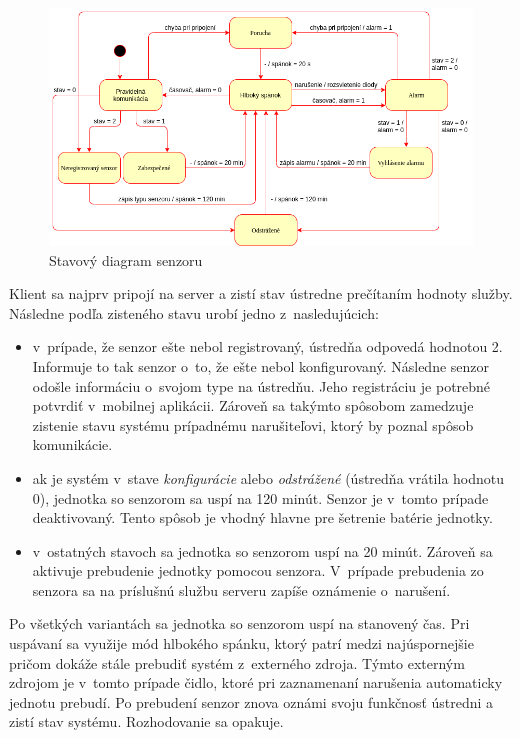 \begin{figure}[ht]
    \centering
    \includegraphics[width=\linewidth]{obrazky-figures/sensor_state_diagram.png}
    \caption[Stavový diagram senzoru]{Stavový diagram senzoru}
    \label{fig:sensor_state_diagram}
\end{figure}


Klient sa najprv pripojí na server a zistí stav ústredne prečítaním hodnoty služby. Následne podľa zisteného stavu urobí jedno z~nasledujúcich:
\begin{itemize}
    \item v~prípade, že senzor ešte nebol registrovaný, ústredňa odpovedá hodnotou 2. Informuje to tak senzor o~to, že ešte nebol konfigurovaný. Následne senzor odošle informáciu o~svojom type na ústredňu. Jeho registráciu je potrebné potvrdiť v~mobilnej aplikácii. Zároveň sa takýmto spôsobom zamedzuje zistenie stavu systému prípadnému narušiteľovi, ktorý by poznal spôsob komunikácie.
    \item ak je systém v~stave \textit{konfigurácie} alebo \textit{odstrážené} (ústredňa vrátila hodnotu 0), jednotka so senzorom sa uspí na 120 minút. Senzor je v~tomto prípade deaktivovaný. Tento spôsob je vhodný hlavne pre šetrenie batérie jednotky.
    \item v~ostatných stavoch sa jednotka so senzorom uspí na 20 minút. Zároveň sa aktivuje prebudenie jednotky pomocou senzora. V~prípade prebudenia zo senzora sa na príslušnú službu serveru zapíše oznámenie o~narušení.
\end{itemize}

Po všetkých variantách sa jednotka so senzorom uspí na stanovený čas. Pri uspávaní sa využije mód hlbokého spánku, ktorý patrí medzi najúspornejšie pričom dokáže stále prebudiť systém z~externého zdroja. Týmto externým zdrojom je v~tomto prípade čidlo, ktoré pri zaznamenaní narušenia automaticky jednotu prebudí. Po prebudení senzor znova oznámi svoju funkčnosť ústredni a zistí stav systému. Rozhodovanie sa opakuje.

